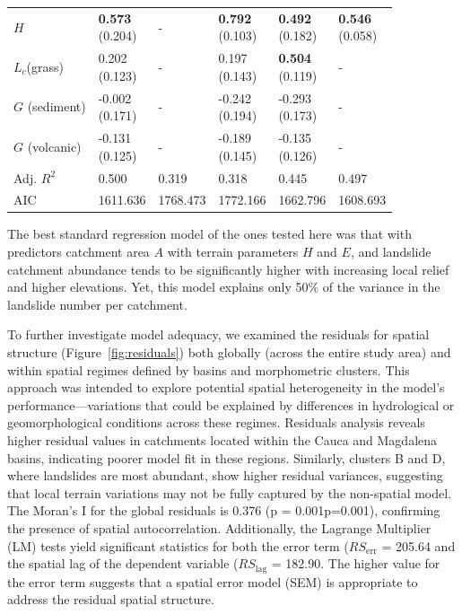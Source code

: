 \documentclass[lineno,pdflatex,sn-basic]{sn-jnl}%
\theoremstyle{thmstyleone}%
\theoremstyle{thmstyletwo}%
\theoremstyle{thmstylethree}%
\begin{document}
\begin{table}[htbp]
\begin{tabular}{llllll}
$H$ & \makecell{\textbf{0.573} \\ (0.204)} & - & \makecell{\textbf{0.792} \\ (0.103)} & \makecell{\textbf{0.492} \\ (0.182)} & \makecell{\textbf{0.546} \\ (0.058)} \\
$L_c$(grass) & \makecell{0.202 \\ (0.123)} & - & \makecell{0.197 \\ (0.143)} & \makecell{\textbf{0.504} \\ (0.119)} & - \\
$G$ (sediment) & \makecell{-0.002 \\ (0.171)} & - & \makecell{-0.242 \\ (0.194)} & \makecell{-0.293 \\ (0.173)} & - \\
$G$ (volcanic) & \makecell{-0.131 \\ (0.125)} & - & \makecell{-0.189 \\ (0.145)} & \makecell{-0.135 \\ (0.126)} & - \\
\midrule
Adj. $R^2$ & 0.500 & 0.319 & 0.318 & 0.445 & 0.497 \\
AIC & 1611.636 & 1768.473 & 1772.166 & 1662.796 & 1608.693 \\
\bottomrule
\end{tabular}
\end{table}

The best standard regression model of the ones tested here was that with predictors catchment area $A$ with terrain parameters $H$ and $E$, and landslide catchment abundance tends to be significantly higher with increasing local relief and higher elevations.
Yet, this model explains only 50\% of the variance in the landslide number per catchment. 

To further investigate model adequacy, we examined the residuals for spatial structure (Figure~\ref{fig:residuals}) both globally (across the entire study area) and within spatial regimes defined by basins and morphometric clusters. 
This approach was intended to explore potential spatial heterogeneity in the model’s performance—variations that could be explained by differences in hydrological or geomorphological conditions across these regimes. 
Residuals analysis reveals higher residual values in catchments located within the Cauca and Magdalena basins, indicating poorer model fit in these regions. 
Similarly, clusters B and D, where landslides are most abundant, show higher residual variances, suggesting that local terrain variations may not be fully captured by the non-spatial model. 
The Moran’s I for the global residuals is 0.376 (p = 0.001p=0.001), confirming the presence of spatial autocorrelation. 
Additionally, the Lagrange Multiplier (LM) tests yield significant statistics for both the error term ($RS_{\text{err}}$ = 205.64 and the spatial lag of the dependent variable ($RS_{\text{lag}}$ = 182.90. 
The higher value for the error term suggests that a spatial error model (SEM) is appropriate to address the residual spatial structure.
\end{document}
